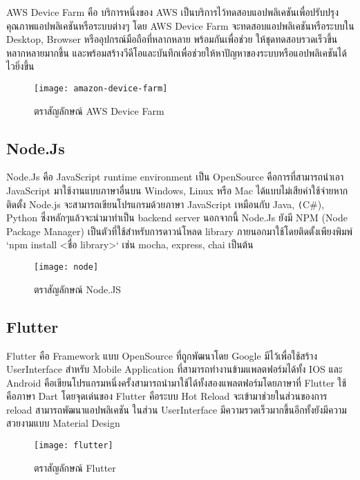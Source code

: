         AWS Device Farm คือ บริการหนึ่งของ AWS เป็นบริการไว้ทดสอบแอปพลิเคชันเพื่อปรับปรุงคุณภาพแอปพลิเคชันหรือระบบต่างๆ
        โดย AWS Device Farm จะทดสอบแอปพลิเคชันหรือระบบใน Desktop, Browser หรืออุปกรณ์มือถือที่หลากหลาย พร้อมกันเพื่อช่วย
        ให้ชุดทดสอบรวดเร็วขึ้น หลากหลายมากขึ้น และพร้อมสร้างวีดีโอและบันทึกเพื่อช่วยให้หาปัญหาของระบบหรือแอปพลิเคชันได้ไวยิ่งขึ้น

        \begin{figure}[H]
            \centering
            \texttt{[image: amazon-device-farm]}
            \caption{ตราสัญลักษณ์ AWS Device Farm}\label{amazon-device-farm}
        \end{figure}

    \subsection{Node.Js}
        Node.Js คือ JavaScript runtime environment เป็น OpenSource คือการที่สามารถนำเอา JavaScript มาใช้งานแบบภาษาอื่นบน
        Windows, Linux หรือ Mac ได้แบบไม่เสียค่าใช้จ่ายหากติดตั้ง Node.js จะสามารถเขียนโปรแกรมด้วยภาษา JavaScript เหมือนกับ Java, \texttt(C\#), Python
        ซึ่งหลักๆแล้วจะนำมาทำเป็น backend server นอกจากนี้ Node.Js ยังมี NPM (Node Package Manager) เป็นตัวที่ใช้สำหรับการดาวน์โหลด
        library ภายนอกมาใช้โดยติดตั้งเพียงพิมพ์ `npm install <ชื่อ library>` เช่น mocha, express, chai เป็นต้น

        \begin{figure}[H]
            \centering
            \texttt{[image: node]}
            \caption{ตราสัญลักษณ์ Node.JS}\label{node}
        \end{figure}
        

    \subsection{Flutter}
        Flutter คือ Framework แบบ OpenSource ที่ถูกพัฒนาโดย Google มีไว้เพื่อใช้สร้าง UserInterface สำหรับ Mobile Application ที่สามารถทำงานข้ามแพลตฟอร์มได้ทั้ง IOS และ Android คือเขียนโปรแกรมหนึ่งครั้งสามารถนำมาใช้ได้ทั้งสองแพลตฟอร์มโดยภาษาที่ Flutter ใช้คือภาษา Dart
        โดยจุดเด่นของ Flutter คือระบบ Hot Reload จะเข้ามาช่วยในส่วนของการ reload สามารถพัฒนาแอปพลิเคชัน ในส่วน UserInterface มีความรวดเร็วมากขึ้นอีกทั้งยังมีความสวยงามแบบ
        Material Design

        \begin{figure}[H]
            \centering
            \texttt{[image: flutter]}
            \caption{ตราสัญลักษณ์ Flutter}\label{flutter}
        \end{figure}

